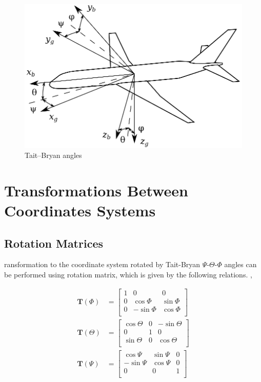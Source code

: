 \begin{figure}
  \centering
  \includegraphics[width=320pt]{images/roll_pitch_yaw.eps}
  \caption{Tait–Bryan angles}
\end{figure}

\section{Transformations Between Coordinates Systems}

\subsection{Rotation Matrices}

ransformation to the coordinate system rotated by Tait-Bryan $\Psi$-$\Theta$-$\Phi$ angles can be performed using rotation matrix, which is given by the following relations. \cite{Padfield2007}, \cite{Sibilski2004}

\begin{align}
  \boldsymbol T \left( \Phi \right) &=
  \left[
    \begin{matrix}
      1 &          0 &         0 \\
      0 &  \cos \Phi & \sin \Phi \\
      0 & -\sin \Phi & \cos \Phi \\
    \end{matrix}
  \right]
  \\
  \boldsymbol T \left( \Theta \right) &=
  \left[
    \begin{matrix}
      \cos \Theta & 0 & -\sin \Theta \\
                0 & 1 &            0 \\
      \sin \Theta & 0 &  \cos \Theta \\
    \end{matrix}
  \right]
  \\
  \boldsymbol T \left( \Psi \right) &=
  \left[
    \begin{matrix}
       \cos\Psi & \sin\Psi & 0 \\
      -\sin\Psi & \cos\Psi & 0 \\
              0 &        0 & 1 \\
    \end{matrix}
  \right]
\end{align}

